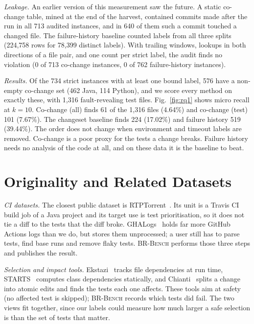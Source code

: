 \documentclass[10pt,conference]{IEEEtran}
\begin{document}
\textit{Leakage.} An earlier version of this measurement saw the future. A static co-change table, mined at the end of the harvest, contained commits made after the run in all 713 audited instances, and in 640 of them such a commit touched a changed file. The failure-history baseline counted labels from all three splits (224,758 rows for 78,399 distinct labels). With trailing windows, lookups in both directions of a file pair, and one count per strict label, the audit finds no violation (0 of 713 co-change instances, 0 of 762 failure-history instances).

\textit{Results.} Of the 734 strict instances with at least one bound label, 576 have a non-empty co-change set (462 Java, 114 Python), and we score every method on exactly these, with 1,316 fault-revealing test files. Fig.~\ref{fig:rq1} shows micro recall at $k=10$. Co-change (all) finds 61 of the 1,316 files (4.64\%) and co-change (test) 101 (7.67\%). The changeset baseline finds 224 (17.02\%) and failure history 519 (39.44\%). The order does not change when environment and timeout labels are removed. Co-change is a poor proxy for the tests a change breaks. Failure history needs no analysis of the code at all, and on these data it is the baseline to beat.

\section{Originality and Related Datasets}
\label{sec:related}

\textit{CI datasets.} The closest public dataset is RTPTorrent~\cite{mattis2020rtptorrent}. Its unit is a Travis CI build job of a Java project and its target use is test prioritisation, so it does not tie a diff to the tests that the diff broke. GHALogs~\cite{moriconi2025ghalogs} holds far more GitHub Actions logs than we do, but stores them unprocessed; a user still has to parse tests, find base runs and remove flaky tests. \textsc{BR-Bench} performs those three steps and publishes the result.

\textit{Selection and impact tools.} Ekstazi~\cite{gligoric2015practical} tracks file dependencies at run time, STARTS~\cite{legunsen2017starts} computes class dependencies statically, and Chianti~\cite{ren2004chianti} splits a change into atomic edits and finds the tests each one affects. These tools aim at safety (no affected test is skipped); \textsc{BR-Bench} records which tests did fail. The two views fit together, since our labels could measure how much larger a safe selection is than the set of tests that matter.
\end{document}
